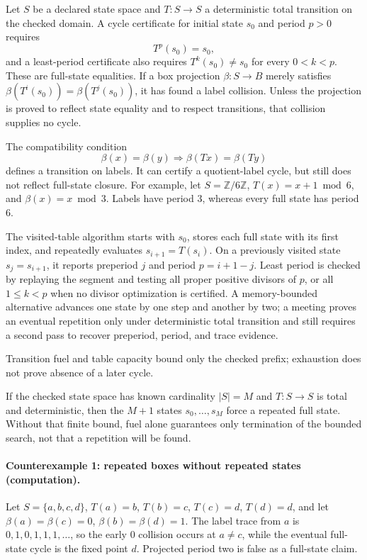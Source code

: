 Let \(S\) be a declared state space and \(T:S\to S\) a deterministic total transition on the checked domain.  A cycle
certificate for initial state \(s_0\) and period \(p>0\) requires
\[
T^p(s_0)=s_0,
\]
and a least-period certificate also requires \(T^k(s_0)\ne s_0\) for every \(0<k<p\).  These are full-state
equalities.  If a box projection \(\beta:S\to B\) merely satisfies
\(\beta(T^i(s_0))=\beta(T^j(s_0))\), it has found a label collision.  Unless the projection is proved to reflect
state equality and to respect transitions, that collision supplies no cycle.

The compatibility condition
\[
 \beta(x)=\beta(y)\Longrightarrow\beta(Tx)=\beta(Ty)
\]
defines a transition on labels.  It can certify a quotient-label cycle, but still does not reflect full-state closure.
For example, let \(S=\mathbb Z/6\mathbb Z\), \(T(x)=x+1\bmod6\), and
\(\beta(x)=x\bmod3\).  Labels have period \(3\), whereas every full state has period \(6\).

The visited-table algorithm starts with \(s_0\), stores each full state with its first index, and repeatedly evaluates
\(s_{i+1}=T(s_i)\).  On a previously visited state \(s_j=s_{i+1}\), it reports preperiod \(j\) and period
\(p=i+1-j\).  Least period is checked by replaying the segment and testing all proper positive divisors of \(p\), or
all \(1\leq k<p\) when no divisor optimization is certified.  A memory-bounded alternative advances one state by one
step and another by two; a meeting proves an eventual repetition only under deterministic total transition and still
requires a second pass to recover preperiod, period, and trace evidence.

Transition fuel and table capacity bound only the checked prefix; exhaustion does not prove absence of a later cycle.

If the checked state space has known cardinality \(|S|=M\) and \(T:S\to S\) is total and deterministic, then the
\(M+1\) states \(s_0,\ldots,s_M\) force a repeated full state.  Without that finite bound, fuel alone guarantees only
termination of the bounded search, not that a repetition will be found.

\paragraph{Counterexample 1: repeated boxes without repeated states (computation).}
Let \(S=\{a,b,c,d\}\), \(T(a)=b\), \(T(b)=c\), \(T(c)=d\), \(T(d)=d\), and let
\(\beta(a)=\beta(c)=0\), \(\beta(b)=\beta(d)=1\).  The label trace from \(a\) is
\(0,1,0,1,1,1,\ldots\), so the early \(0\) collision occurs at \(a\ne c\), while the eventual full-state cycle is
the fixed point \(d\).  Projected period two is false as a full-state claim.

